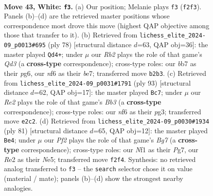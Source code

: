 \documentclass[11pt]{article}
\begin{document}
\clearpage

\begin{figure}[p]\centering
\begin{subfigure}{0.46\textwidth}\centering
\resizebox{\linewidth}{!}{%
\newchessgame
\chessboard[
  setfen={5k2/1b3p2/2q2np1/7p/8/6P1/1R2RP1P/5NK1 w - - 1 43},
  showmover=false,
  pgfstyle=straightmove, color=movearrow, markmove={f2-f3}
]}
\caption{}
\end{subfigure}\hfill
\begin{subfigure}{0.46\textwidth}\centering
\resizebox{\linewidth}{!}{%
\newchessgame
\chessboard[
  setfen={3n4/4b1k1/4q1p1/7p/8/2RQ2P1/5PKP/8 w - - 8 40},
  showmover=false,
  pgfstyle=straightmove, color=movearrow, markmove={d3-d4}
]}
\caption{}
\end{subfigure}
\\[4pt]
\begin{subfigure}{0.46\textwidth}\centering
\resizebox{\linewidth}{!}{%
\newchessgame
\chessboard[
  setfen={8/5pk1/1b3rpp/8/7P/3Q1BP1/5PK1/8 b - - 4 47},
  showmover=false,
  pgfstyle=straightmove, color=movearrow, markmove={b6-c7}
]}
\caption{}
\end{subfigure}\hfill
\begin{subfigure}{0.46\textwidth}\centering
\resizebox{\linewidth}{!}{%
\newchessgame
\chessboard[
  setfen={8/Q4ppk/4p2p/1B1rn3/PK5P/2P5/6b1/8 b - - 0 41},
  showmover=false,
  pgfstyle=straightmove, color=movearrow, markmove={g2-e4}
]}
\caption{}
\end{subfigure}
\caption{\textbf{Move 43, White: \texttt{f3}.} (a) Our position; Melanie plays \texttt{f3} (\texttt{f2f3}). Panels (b)--(d) are the retrieved master positions whose correspondence most drove this move (highest QAP objective among those that transfer to it). (b) Retrieved from \texttt{lichess\_elite\_2024-09\_p0013\#695} (ply 78) [structural distance $d$=63, QAP obj=36]: the master played \texttt{Qd4+}; under $\mu$ our \emph{Rb2} plays the role of that game's \emph{Qd3} (a \textbf{cross-type} correspondence); cross-type roles: our \emph{b}b7 as their \emph{p}g6, our \emph{n}f6 as their \emph{b}e7; transferred move \texttt{b2b3}. (c) Retrieved from \texttt{lichess\_elite\_2024-09\_p0031\#1791} (ply 93) [structural distance $d$=62, QAP obj=17]: the master played \texttt{Bc7}; under $\mu$ our \emph{Re2} plays the role of that game's \emph{Bb3} (a \textbf{cross-type} correspondence); cross-type roles: our \emph{n}f6 as their \emph{p}g3; transferred move \texttt{e2c2}. (d) Retrieved from \texttt{lichess\_elite\_2024-09\_p0030\#1934} (ply 81) [structural distance $d$=65, QAP obj=12]: the master played \texttt{Be4}; under $\mu$ our \emph{Pf2} plays the role of that game's \emph{Bg7} (a \textbf{cross-type} correspondence); cross-type roles: our \emph{N}f1 as their \emph{P}g7, our \emph{R}e2 as their \emph{N}e5; transferred move \texttt{f2f4}. Synthesis: no retrieved analog transferred to \texttt{f3} -- the \texttt{search} selector chose it on value (material / mate); panels (b)--(d) show the strongest nearby analogies.}
\label{fig:thought-m84}
\end{figure}
\end{document}
